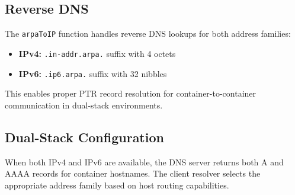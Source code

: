 \subsection{Reverse DNS}
\label{sec:reverse-dns}

The \texttt{arpaToIP} function handles reverse DNS lookups for both
address families:

\begin{itemize}[leftmargin=*, itemsep=3pt]
  \item \textbf{IPv4:} \texttt{.in-addr.arpa.} suffix with 4 octets
  \item \textbf{IPv6:} \texttt{.ip6.arpa.} suffix with 32 nibbles
\end{itemize}

This enables proper PTR record resolution for container-to-container
communication in dual-stack environments.

\subsection{Dual-Stack Configuration}
\label{sec:dual-stack}

When both IPv4 and IPv6 are available, the DNS server returns both
A and AAAA records for container hostnames. The client resolver
selects the appropriate address family based on host routing
capabilities.
